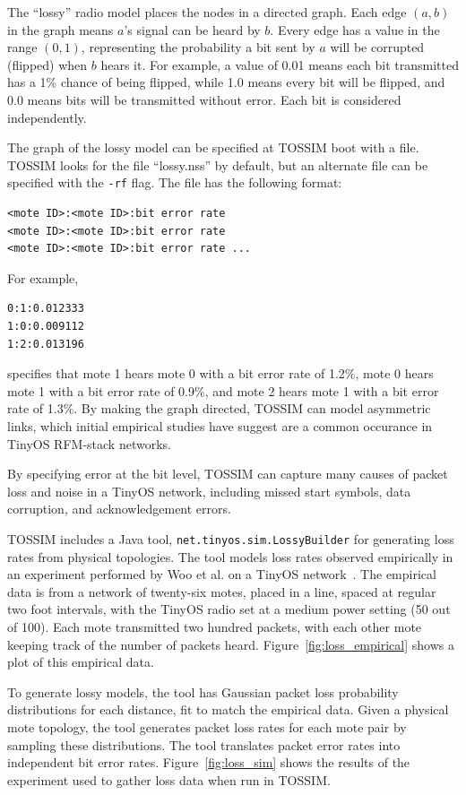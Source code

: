 \documentclass[10pt,fleqn]{article}
\def\sim{TOSSIM\xspace}
\def\mote{mote\xspace}
\def\motes{motes\xspace}
\begin{document}
The ``lossy'' radio model places the nodes in a directed graph. Each
edge $(a,b)$ in the graph means $a$'s signal can be heard by
$b$. Every edge has a value in the range $(0,1)$, representing the
probability a bit sent by $a$ will be corrupted (flipped) when $b$
hears it. For example, a value of 0.01 means each bit transmitted has
a 1\% chance of being flipped, while 1.0 means every bit will be
flipped, and 0.0 means bits will be transmitted without error. Each
bit is considered independently.

The graph of the lossy model can be specified at \sim boot with a
file. \sim looks for the file ``lossy.nss'' by default, but an
alternate file can be specified with the {\tt -rf} flag. The file has
the following format:

\begin{verbatim}
<mote ID>:<mote ID>:bit error rate
<mote ID>:<mote ID>:bit error rate
<mote ID>:<mote ID>:bit error rate ...
\end{verbatim}

For example,

\begin{verbatim}
0:1:0.012333
1:0:0.009112
1:2:0.013196
\end{verbatim}

\noindent specifies that mote 1 hears mote 0 with a bit error rate of 1.2\%,
mote 0 hears mote 1 with a bit error rate of 0.9\%, and mote 2 hears
mote 1 with a bit error rate of 1.3\%. By making the graph directed,
\sim can model asymmetric links, which initial empirical studies have
suggest are a common occurance in TinyOS RFM-stack networks.

By specifying error at the bit level, \sim can capture many causes of
packet loss and noise in a TinyOS network, including missed start
symbols, data corruption, and acknowledgement errors.

\sim includes a Java tool, {\tt net.tinyos.sim.LossyBuilder} for generating
loss rates from physical topologies.  The tool models loss rates
observed empirically in an experiment performed by Woo et al. on a
TinyOS network~\cite{empirical}.  The empirical data is from a network
of twenty-six \motes, placed in a line, spaced at regular two foot
intervals, with the TinyOS radio set at a medium power setting (50 out
of 100). Each \mote transmitted two hundred packets, with each other
\mote keeping track of the number of packets
heard. Figure~\ref{fig:loss_empirical} shows a plot of this empirical
data.

To generate lossy models, the tool has Gaussian packet loss
probability distributions for each distance, fit to match the
empirical data. Given a physical \mote topology, the tool generates
packet loss rates for each \mote pair by sampling these
distributions. The tool translates packet error rates into independent
bit error rates.  Figure~\ref{fig:loss_sim} shows the results of the
experiment used to gather loss data when run in \sim.
\end{document}
